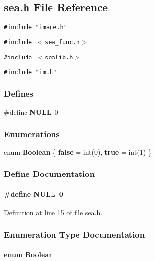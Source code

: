 \subsection{sea.h File Reference}
\label{sea.h}
{\tt \#include "image.h"}\par
{\tt \#include $<$sea\_\-func.h$>$}\par
{\tt \#include $<$sealib.h$>$}\par
{\tt \#include "im.h"}\par
\subsubsection*{Defines}
\begin{CompactItemize}
\item 
\#define {\bf NULL}\ 0
\end{CompactItemize}
\subsubsection*{Enumerations}
\begin{CompactItemize}
\item 
enum {\bf Boolean} \{ {\bf false} = int(0), 
{\bf true} = int(1)
 \}
\end{CompactItemize}


\subsubsection{Define Documentation}
\label{sea.h_a0}
\paragraph{\setlength{\rightskip}{0pt plus 5cm}\#define NULL\ 0}\hfill



Definition at line 15 of file sea.h.

\subsubsection{Enumeration Type Documentation}
\label{sea.h_a3}
\paragraph{\setlength{\rightskip}{0pt plus 5cm}enum Boolean}\hfill

